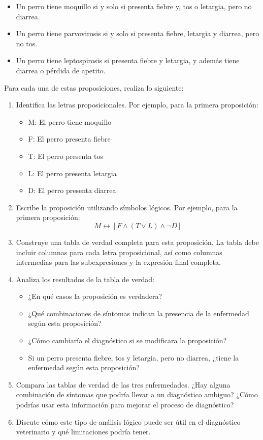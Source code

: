 \documentclass[a4,11pt]{aleph-notas}
\begin{document}
\begin{itemize}
    \item Un perro tiene moquillo si y solo si presenta fiebre y, tos o letargia, pero no diarrea.
    \item Un perro tiene parvovirosis si y solo si presenta fiebre, letargia y diarrea, pero no tos.
    \item Un perro tiene leptospirosis si presenta fiebre y letargia, y además tiene diarrea o pérdida de apetito.
\end{itemize}

Para cada una de estas proposiciones, realiza lo siguiente:

\begin{enumerate}
    \item Identifica las letras proposicionales. Por ejemplo, para la primera proposición:
       \begin{itemize}
         \item M: El perro tiene moquillo
         \item F: El perro presenta fiebre
         \item T: El perro presenta tos
         \item L: El perro presenta letargia
         \item D: El perro presenta diarrea
       \end{itemize}
    
    \item Escribe la proposición utilizando símbolos lógicos. Por ejemplo, para la primera proposición:
       \[M \leftrightarrow [F \land (T \lor L) \land \lnot D]\]
    
    \item Construye una tabla de verdad completa para esta proposición. La tabla debe incluir columnas para cada letra proposicional, así como columnas intermedias para las subexpresiones y la expresión final completa.
    
    \item Analiza los resultados de la tabla de verdad:
       \begin{itemize}
         \item ¿En qué casos la proposición es verdadera?
         \item ¿Qué combinaciones de síntomas indican la presencia de la enfermedad según esta proposición?
         \item ¿Cómo cambiaría el diagnóstico si se modificara la proposición?
         \item Si un perro presenta fiebre, tos y letargia, pero no diarrea, ¿tiene la enfermedad según esta proposición?
       \end{itemize}

    \item Compara las tablas de verdad de las tres enfermedades. ¿Hay alguna combinación de síntomas que podría llevar a un diagnóstico ambiguo? ¿Cómo podrías usar esta información para mejorar el proceso de diagnóstico?
    
    \item Discute cómo este tipo de análisis lógico puede ser útil en el diagnóstico veterinario y qué limitaciones podría tener.
\end{enumerate}
\end{document}
